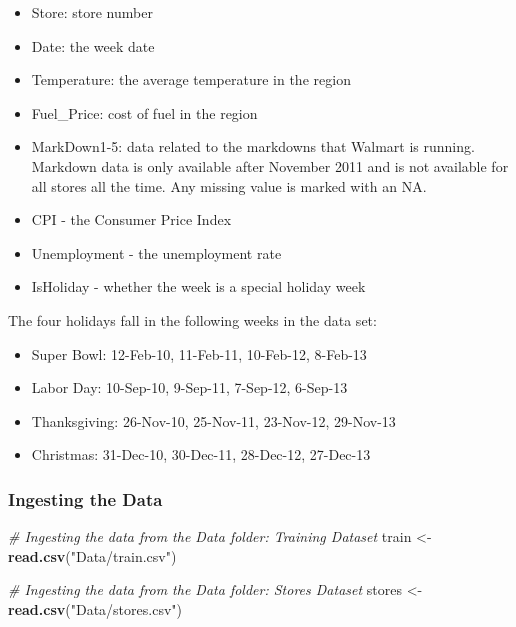 \documentclass[]{article}
\newenvironment{Shaded}{\begin{snugshade}}{\end{snugshade}}
\newcommand{\KeywordTok}[1]{\textcolor[rgb]{0.13,0.29,0.53}{\textbf{{#1}}}}
\newcommand{\StringTok}[1]{\textcolor[rgb]{0.31,0.60,0.02}{{#1}}}
\newcommand{\CommentTok}[1]{\textcolor[rgb]{0.56,0.35,0.01}{\textit{{#1}}}}
\newcommand{\NormalTok}[1]{{#1}}
\begin{document}
\begin{itemize}
\itemsep1pt\parskip0pt
\item
  Store: store number
\item
  Date: the week date
\item
  Temperature: the average temperature in the region
\item
  Fuel\_Price: cost of fuel in the region
\item
  MarkDown1-5: data related to the markdowns that Walmart is running.
  Markdown data is only available after November 2011 and is not
  available for all stores all the time. Any missing value is marked
  with an NA.
\item
  CPI - the Consumer Price Index
\item
  Unemployment - the unemployment rate
\item
  IsHoliday - whether the week is a special holiday week
\end{itemize}

The four holidays fall in the following weeks in the data set:

\begin{itemize}
\itemsep1pt\parskip0pt
\item
  Super Bowl: 12-Feb-10, 11-Feb-11, 10-Feb-12, 8-Feb-13
\item
  Labor Day: 10-Sep-10, 9-Sep-11, 7-Sep-12, 6-Sep-13
\item
  Thanksgiving: 26-Nov-10, 25-Nov-11, 23-Nov-12, 29-Nov-13
\item
  Christmas: 31-Dec-10, 30-Dec-11, 28-Dec-12, 27-Dec-13
\end{itemize}

\subsubsection{Ingesting the Data}\label{ingesting-the-data}

\begin{Shaded}
\begin{Highlighting}[]
\CommentTok{# Ingesting the data from the Data folder: Training Dataset}
\NormalTok{train <-}\StringTok{ }\KeywordTok{read.csv}\NormalTok{(}\StringTok{"Data/train.csv"}\NormalTok{)}
\end{Highlighting}
\end{Shaded}

\begin{Shaded}
\begin{Highlighting}[]
\CommentTok{# Ingesting the data from the Data folder: Stores Dataset}
\NormalTok{stores <-}\StringTok{ }\KeywordTok{read.csv}\NormalTok{(}\StringTok{"Data/stores.csv"}\NormalTok{)}
\end{Highlighting}
\end{Shaded}
\end{document}
